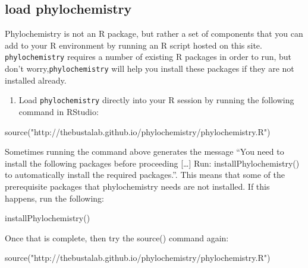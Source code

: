 \documentclass[
]{krantz}
\newenvironment{Shaded}{\begin{snugshade}}{\end{snugshade}}
\newcommand{\FunctionTok}[1]{\textcolor[rgb]{0.00,0.00,0.00}{#1}}
\newcommand{\NormalTok}[1]{#1}
\newcommand{\StringTok}[1]{\textcolor[rgb]{0.31,0.60,0.02}{#1}}
\providecommand{\tightlist}{%
  \setlength{\itemsep}{0pt}\setlength{\parskip}{0pt}}
\begin{document}
\hypertarget{load-phylochemistry}{%
\subsection{load phylochemistry}\label{load-phylochemistry}}

Phylochemistry is not an R package, but rather a set of components that you can add to your R environment by running an R script hosted on this site. \texttt{phylochemistry} requires a number of existing R packages in order to run, but don't worry,\texttt{phylochemistry} will help you install these packages if they are not installed already.

\begin{enumerate}
\def\labelenumi{\arabic{enumi}.}
\tightlist
\item
  Load \texttt{phylochemistry} directly into your R session by running the following command in RStudio:
\end{enumerate}

\begin{Shaded}
\begin{Highlighting}[]
\FunctionTok{source}\NormalTok{(}\StringTok{"http://thebustalab.github.io/phylochemistry/phylochemistry.R"}\NormalTok{)}
\end{Highlighting}
\end{Shaded}

\hfill\break
Sometimes running the command above generates the message ``You need to install the following packages before proceeding {[}\ldots{]} Run: installPhylochemistry() to automatically install the required packages.''. This means that some of the prerequisite packages that phylochemistry needs are not installed. If this happens, run the following:\\

\begin{Shaded}
\begin{Highlighting}[]
\FunctionTok{installPhylochemistry}\NormalTok{()}
\end{Highlighting}
\end{Shaded}

\hfill\break
Once that is complete, then try the source() command again:

\begin{Shaded}
\begin{Highlighting}[]
\FunctionTok{source}\NormalTok{(}\StringTok{"http://thebustalab.github.io/phylochemistry/phylochemistry.R"}\NormalTok{)}
\end{Highlighting}
\end{Shaded}
\end{document}
